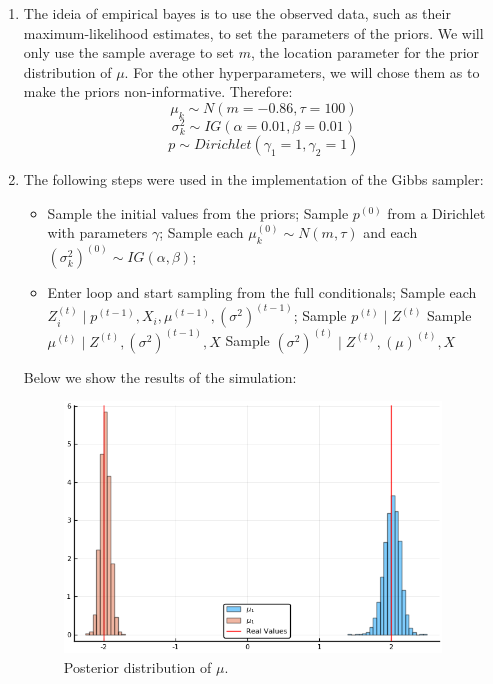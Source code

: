 \documentclass[12pt,letterpaper]{article}
\begin{document}
\begin{enumerate}[leftmargin=!,labelindent=5pt]
\item The ideia of empirical bayes
is to use the observed data, such as
their maximum-likelihood estimates,
to set the parameters of the priors. We will only use the
sample average to set $m$, the location parameter for the
prior distribution of $\mu$. For the other hyperparameters,
we will chose them as to make the priors non-informative. Therefore:
$$\mu_k \sim N(m = -0.86,\tau = 100)$$
$$\sigma^2_k \sim IG(\alpha = 0.01,\beta = 0.01)$$
$$p \sim Dirichlet(\gamma_1 =1,\gamma_2 = 1)$$

\item The following steps were used in the implementation of the Gibbs
sampler:

\begin{itemize}
	\item Sample the initial values from the priors;	
	\subitem Sample $p^{(0)}$ from a Dirichlet with parameters $\gamma$;
	\subitem Sample each $\mu_k^{(0)} \sim N(m, \tau)$ and each
$(\sigma_k^2)^{(0)} \sim IG(\alpha, \beta)$;

\item Enter loop and start sampling from the full conditionals;
	\subitem Sample each $Z_i^{(t)} \mid
	p^{(t-1)},X_i,\mu^{(t-1)},(\sigma^2)^{(t-1)}$;
	\subitem Sample $p^{(t)} \mid Z^{(t)}$
	\subitem Sample $\mu^{(t)} \mid Z^{(t)},(\sigma^2)^{(t-1)},X$
	\subitem Sample $(\sigma^2)^{(t)}
	\mid Z^{(t)},(\mu)^{(t)},X$
\end{itemize}

Below we show the results of the simulation:

\begin{figure}[H]
    \centering
    \includegraphics[width=10cm]{images/Ex8_1.png}
    \caption{Posterior distribution of $\mu$.
    }
    \label{fig:2}
\end{figure}


\end{enumerate}
\end{document}
